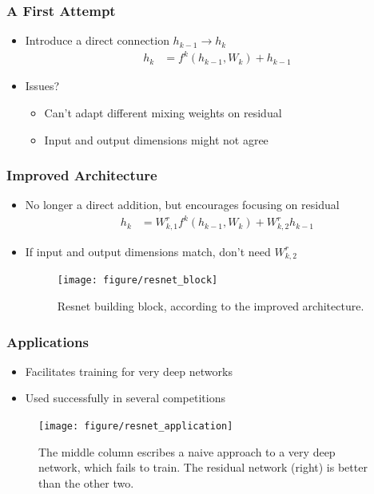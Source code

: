 \documentclass[10pt,mathserif]{beamer}
\begin{document}
\begin{frame}
  \frametitle{A First Attempt}
  \begin{itemize}
  \item Introduce a direct connection $h_{k - 1} \rightarrow h_k$
    \begin{align*}
      h_{k} &= f^{k}\left(h_{k - 1}, W_{k}\right) + h_{k - 1}
    \end{align*}
  \item Issues?
    \begin{itemize}
    \item Can't adapt different mixing weights on residual
    \item Input and output dimensions might not agree
    \end{itemize}
  \end{itemize}
\end{frame}

\begin{frame}
  \frametitle{Improved Architecture}
  \begin{itemize}
  \item No longer a direct addition, but encourages focusing on residual
    \begin{align*}
      h_{k} &= W^{r}_{k,1}f^{k}\left(h_{k - 1}, W_{k}\right) + W^{r}_{k,2}h_{k - 1}
    \end{align*}
  \item If input and output dimensions match, don't need $W^{r}_{k,2}$
    \begin{figure}[ht]
      \centering
      \texttt{[image: figure/resnet\_block]}
      \caption{Resnet building block, according to the improved
        architecture.\label{fig:resnet_block} }
    \end{figure}
  \end{itemize}
\end{frame}

\begin{frame}
  \frametitle{Applications}
  \begin{itemize}
  \item Facilitates training for very deep networks
  \item Used successfully in several competitions
  \end{itemize}
  \begin{figure}[ht]
    \centering
    \texttt{[image: figure/resnet\_application]}
    \caption{The middle column escribes a naive approach to a very deep network,
      which fails to train. The residual network (right) is better than the other
      two. \label{fig:resnet_application} }
  \end{figure}
\end{frame}
\end{document}
